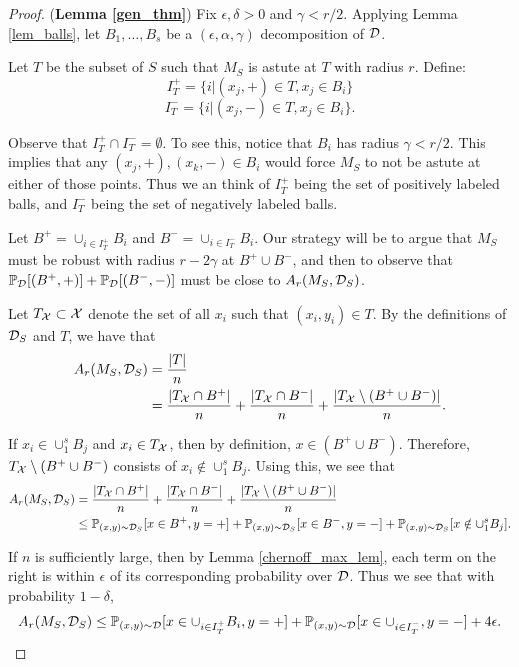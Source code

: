 \begin{proof} (\textbf{Lemma \ref{gen_thm}})
Fix $\epsilon, \delta > 0$ and $\gamma < r/2$. Applying Lemma \ref{lem_balls}, let $B_1, \dots, B_s$ be a $(\epsilon, \alpha, \gamma)$ decomposition of ${\mathcal D}$. 

Let $T$ be the subset of $S$ such that $M_S$ is astute at $T$ with radius $r$. Define: $$I_T^+ = \{i| (x_j, +) \in T, x_j \in B_i\}$$$$I_T^- = \{i| (x_j, -) \in T, x_j \in B_i\}.$$

Observe that $I_T^+ \cap I_T^- = \emptyset$. To see this, notice that $B_i$ has radius $\gamma < r/2$. This implies that any $(x_j, +), (x_k, -) \in B_i$ would force $M_S$ to not be astute at either of those points. Thus we an think of $I_T^+$ being the set of positively labeled balls, and $I_T^{-}$ being the set of negatively labeled balls.

Let $B^+ = \cup_{i \in I_T^+} B_i$ and $B^- = \cup_{i \in I_T^-} B_i$. Our strategy will be to argue that $M_S$ must be robust with radius $r-2\gamma$ at $B^+ \cup B^-$, and then to observe that $\mathbb{P}_{\mathcal D}[(B^+, +)] + \mathbb{P}_{\mathcal D}[(B^-, -)]$ must be close to $A_r(M_S, {\mathcal D}_S)$. 

Let $T_\mathcal X \subset \mathcal X$ denote the set of all $x_i$ such that $(x_i, y_i) \in T$. By the definitions of ${\mathcal D}_S$ and $T$, we have that 
\begin{equation*}
\begin{split}
A_r(M_S, {\mathcal D}_S) &= \frac{|T|}{n} \\
&= \frac{|T_\mathcal X \cap B^+|}{n} + \frac{|T_\mathcal X \cap B^-|}{n} + \frac{|T_\mathcal X \setminus (B^+ \cup B^-)|}{n}.
\end{split}
\end{equation*}

If $x_i \in \cup_1^s B_j$ and $x_i \in T_\mathcal X$, then by definition, $x \in (B^+ \cup B^-)$. Therefore, $T_\mathcal X \setminus (B^+ \cup B^-)$ consists of $x_i \notin \cup_1^s B_j$. Using this, we see that 
\begin{equation*}
\begin{split}
A_r(M_S, {\mathcal D}_S) &= \frac{|T_\mathcal X \cap B^+|}{n} + \frac{|T_\mathcal X \cap B^-|}{n} + \frac{|T_\mathcal X \setminus (B^+ \cup B^-)|}{n} \\
&\leq \mathbb{P}_{(x,y) \sim {\mathcal D}_S}[x \in B^+, y=+]+\mathbb{P}_{(x,y) \sim {\mathcal D}_S}[x \in B^-, y=-] + \mathbb{P}_{(x,y) \sim {\mathcal D}_S}[x \notin \cup_1^s B_j].
\end{split}
\end{equation*}

If $n$ is sufficiently large, then by Lemma \ref{chernoff_max_lem}, each term on the right is within $\epsilon$ of its corresponding probability over ${\mathcal D}$. Thus we see that with probability $1-\delta$, 
\begin{equation}\label{astute_bound_eqn}
A_r(M_S, {\mathcal D}_S) \leq \mathbb{P}_{(x,y) \sim {\mathcal D}}[x \in \cup_{i \in I_T^+}B_i, y=+]+\mathbb{P}_{(x,y) \sim {\mathcal D}}[x \in \cup_{i \in I_T^-}, y=-] + 4\epsilon.
\end{equation} 


\end{proof}
